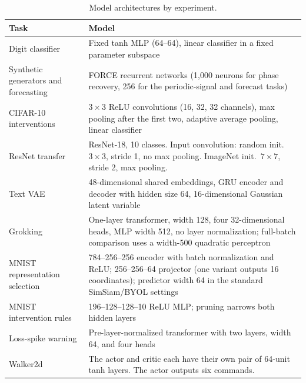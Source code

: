 \begin{table}[htbp]
\centering\small
\caption{Model architectures by experiment.}
\label{tab:architectures}
\begin{tabularx}{\linewidth}{@{}>{\raggedright\arraybackslash}p{.26\linewidth}X@{}}
\toprule
Task & Model \\
\midrule
Digit classifier & Fixed tanh MLP (64--64), linear classifier in a fixed parameter subspace \\
Synthetic generators and forecasting & FORCE recurrent networks (1,000 neurons for phase recovery, 256 for the periodic-signal and forecast tasks) \\
CIFAR-10 interventions & $3\times3$ ReLU convolutions (16, 32, 32 channels), max pooling after the first two, adaptive average pooling, linear classifier \\
ResNet transfer & ResNet-18, 10 classes. Input convolution: random init.\ $3\times3$, stride 1, no max pooling. ImageNet init.\ $7\times7$, stride 2, max pooling. \\
Text VAE & 48-dimensional shared embeddings, GRU encoder and decoder with hidden size 64, 16-dimensional Gaussian latent variable \\
Grokking & One-layer transformer, width 128, four 32-dimensional heads, MLP width 512, no layer normalization; full-batch comparison uses a width-500 quadratic perceptron \\
MNIST representation selection & 784--256--256 encoder with batch normalization and ReLU; 256--256--64 projector (one variant outputs 16 coordinates); predictor width 64 in the standard SimSiam/BYOL settings \\
MNIST intervention rules & 196--128--128--10 ReLU MLP; pruning narrows both hidden layers \\
Loss-spike warning & Pre-layer-normalized transformer with two layers, width 64, and four heads \\
Walker2d & The actor and critic each have their own pair of 64-unit tanh layers. The actor outputs six commands. \\
\bottomrule
\end{tabularx}
\end{table}

